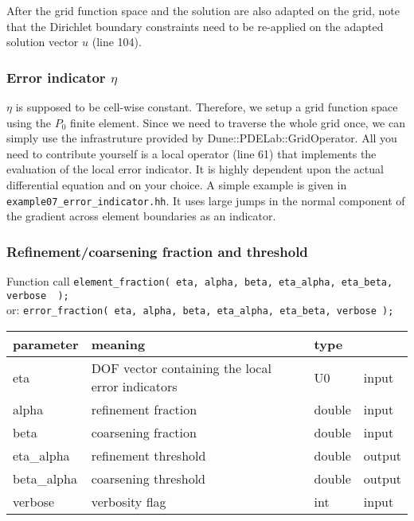 After the grid function space and the solution are also adapted on the grid,
note that the Dirichlet boundary constraints need to be
re-applied on the adapted solution vector $u$ (line 104).


\subsubsection*{Error indicator $\eta$}
$\eta$ is supposed to be cell-wise constant. Therefore, we setup a grid function space using the $P_0$
finite element. Since we need to traverse the whole grid once, we can
simply use the infra\/struture provided by Dune::PDELab::GridOperator.
All you need to contribute yourself is a local operator (line 61) that
implements the evaluation of the local error indicator.
It is highly dependent upon the actual differential equation and on your
choice. A simple example is given in \lstinline{example07_error_indicator.hh}.
It uses large jumps in the normal component of the gradient across element
boundaries as an indicator.



\subsubsection*{Refinement/coarsening fraction and threshold}
\begin{block}{Function call}
  \lstinline{element_fraction( eta, alpha, beta, eta_alpha, eta_beta, verbose  );}\\
  or: \lstinline{error_fraction( eta, alpha, beta, eta_alpha, eta_beta, verbose );}
\end{block}

\begin{tabular}{l|lll}
  parameter   & meaning                                          & type    &  \\
\hline
  eta         & DOF vector containing the local error indicators & U0      & input \\
  alpha       & refinement fraction                              & double  & input  \\
  beta        & coarsening fraction                              & double  & input  \\
  eta\_alpha  & refinement threshold                             & double  & output \\
  beta\_alpha & coarsening threshold                             & double  & output \\
  verbose     & verbosity flag                                   & int     & input  \\
\end{tabular}



